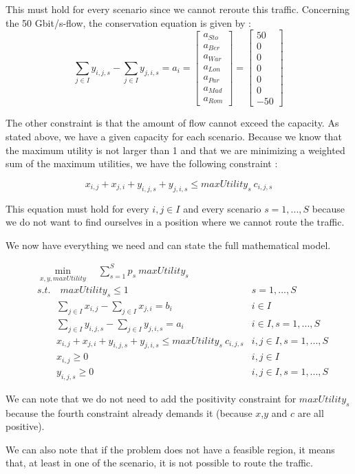  This must hold for every scenario since we cannot reroute this traffic. Concerning the 50 Gbit/s-flow, the conservation equation is given by : 
 $$\sum_{j\in I} y_{i,j,s} - \sum_{j\in I}y_{j,i,s} = a_i = \begin{bmatrix}
  a_{Sto}\\
  a_{Ber}\\
  a_{War}\\
  a_{Lon}\\
  a_{Par}\\
  a_{Mad}\\
  a_{Rom}
 \end{bmatrix} =
 \begin{bmatrix}
  50\\
  0\\
  0\\
  0\\
  0\\
  0\\
  -50
 \end{bmatrix}$$
 
 The other constraint is that the amount of flow cannot exceed the capacity. As stated above, we have a given capacity for each scenario. Because we know that the maximum utility is not larger than 1 and that we are minimizing a weighted sum of the maximum utilities, we have the following constraint :
 
 $$x_{i,j}+x_{j,i}+y_{i,j,s}+y_{j,i,s} \leq maxUtility_s \: c_{i,j,s}$$
 
 This equation must hold for every $i,j \in I$ and every scenario $s=1,...,S$ because we do not want to find ourselves in a position where we cannot route the traffic.
 
 We now have everything we need and can state the full mathematical model.
 
 \begin{align*}
 &\min_{x,y,maxUtility} \quad \sum_{s=1}^S p_s \: maxUtility_s &\\
 &s.t. \quad maxUtility_s \leq 1 &s=1,...,S\\
 &\quad\quad \sum_{j\in I}x_{i,j} - \sum_{j\in I}x_{j,i} = b_i &i\in I\\
 &\quad\quad \sum_{j\in I}y_{i,j,s} - \sum_{j\in I}y_{j,i,s} = a_i &i\in I,s=1,...,S\\
 &\quad\quad x_{i,j}+x_{j,i}+y_{i,j,s}+y_{j,i,s} \leq maxUtility_s \: c_{i,j,s} &i,j\in I , s=1,...,S\\
 &\quad\quad x_{i,j} \geq 0 & i,j\in I\\
 &\quad \quad y_{i,j,s} \geq 0 & i,j\in I, s=1,...,S
 \end{align*}
 
 We can note that we do not need to add the positivity constraint for $maxUtility_s$ because the fourth constraint already demands it (because $x$,$y$ and $c$ are all positive).
 
 We can also note that if the problem does not have a feasible region, it means that, at least in one of the scenario, it is not possible to route the traffic.



 